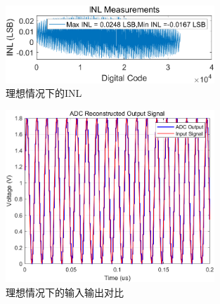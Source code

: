 \documentclass[cs4size,a4paper]{ctexart}
\numberwithin{equation}{section}
\numberwithin{table}{section}
\numberwithin{figure}{section}
\begin{document}
		\begin{figure}[H]
			\centering
			\includegraphics[width=0.7\textwidth]{pic/ideal/INL.png}
			\caption{理想情况下的INL} 
		\end{figure}

		\begin{figure}[H]
			\centering
			\includegraphics[width=0.7\textwidth]{pic/ideal/inout.png}
			\caption{理想情况下的输入输出对比} 
		\end{figure}
\end{document}
